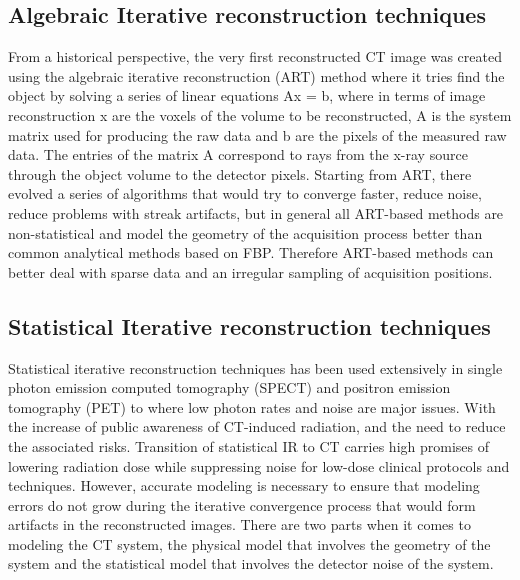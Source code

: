 \subsection{Algebraic Iterative reconstruction techniques}
From a historical perspective, the very first reconstructed CT image was created using the algebraic iterative reconstruction (ART) method where it tries find the object by solving a series of linear equations Ax = b, where in terms of image reconstruction x are the voxels of the volume to be reconstructed, A is the system matrix used for producing the raw data and b are the pixels of the measured raw data.  The entries of the matrix A correspond to rays from the x-ray source through the object volume to the detector pixels.  Starting from ART, there evolved a series of algorithms that would try to converge faster, reduce noise, reduce problems with streak artifacts, but in general all ART-based methods are non-statistical and model the geometry of the acquisition process better than common analytical methods based on FBP.  Therefore ART-based methods can better deal with sparse data and an irregular sampling of acquisition positions\citep{Beister2012}.

\subsection{Statistical Iterative reconstruction techniques}
Statistical iterative reconstruction techniques has been used extensively in single photon emission computed tomography (SPECT) and positron emission tomography (PET) to where low photon rates and noise are major issues.  With the increase of public awareness of CT-induced radiation, and the need to reduce the associated risks. Transition of statistical IR to CT carries high promises of lowering radiation dose while suppressing noise for low-dose clinical protocols and techniques.  However, accurate modeling is necessary to ensure that modeling errors do not grow during the iterative convergence process that would form artifacts in the reconstructed images.  There are two parts when it comes to modeling the CT system, the physical model that involves the geometry of the system and the statistical model that involves the detector noise of the system.  

